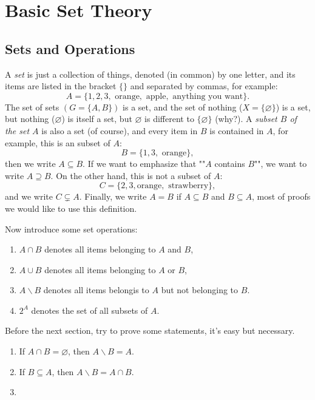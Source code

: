 \chapter{Basic Set Theory}
\label{part:vector-spaces-scalars-quotients}


\label{chap:foundations}

\section{Sets and Operations}
\label{sec:sets-basic-constructions}
A \textit{set} is just a collection of things, denoted (in common) by one letter, and its items are listed in the bracket $\{\}$ and separated by commas, for example:
\[
    A = \{1,2,3, \text{ orange}, \text{ apple}, \text{ anything you want}\}.
\]
The set of sets $(G = \{A,B\})$ is a set, and the set of nothing ($X = \{\varnothing\}$) is a set, but nothing ($\varnothing$) is itself a set, but $\varnothing$ is different to $\{\varnothing\}$ (why?). A \textit{subset $B$ of the set $A$} is also a set (of course), and every item in $B$ is contained in $A$, for example, this is an subset of $A$:
\[
    B = \{1,3, \text{ orange}\},
\]
then we write $A \subseteq B$. If we want to emphasize that ""$A$ contains $B$"", we want to write $A \supseteq B$. On the other hand, this is not a subset of $A$: 
\[
    C = \{2,3, \text{orange}, \text{ strawberry}\},
\]
and we write $C \subsetneq A$. Finally, we write $A = B$ if $A \subseteq B$ and $B \subseteq A$, most of proofs we would like to use this definition.

Now introduce some set operations: 
\begin{enumerate}
    \item $A \cap B$ denotes all items belonging to $A$ and $B$,
    \item $A \cup B$ denotes all items belonging to $A$ or $B$,
    \item $A \backslash B$ denotes all items belongis to $A$ but not belonging to $B$.
    \item $2^A$ denotes the set of all subsets of $A$.
\end{enumerate}  
Before the next section, try to prove some statements, it's easy but necessary.
\begin{enumerate}
    \item  If $A \cap B = \varnothing$, then $A \backslash B = A$.
    \item If $B \subseteq A$, then $A \backslash B = A \cap B$.
    \item 
\end{enumerate}


